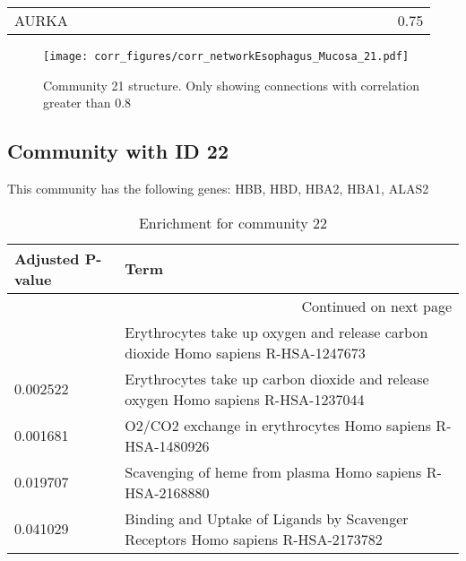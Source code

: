\begin{longtable}{lrrrrrrrrrrrrrrrrrrrrrrr}
AURKA  &              &            &             &             &            &             &             &              &             &             &              &              &             &             &            &            &             &             &             &            &             &             &        0.75 \\
\end{longtable}


\begin{figure}[h!]
\centering
\texttt{[image: corr\_figures/corr\_networkEsophagus\_Mucosa\_21.pdf]}
\caption{Community 21 structure. Only showing connections with correlation greater than 0.8}
\end{figure}




\subsection*{Community with ID 22}
This community has the following genes: HBB, HBD, HBA2, HBA1, ALAS2
\\
\begin{longtable}{p{2.4cm}p{14.5cm}}
\caption{Enrichment for community 22}\\
\toprule
Adjusted \newline P-value &                                                                               Term \\
\midrule
\endhead
\midrule
\multicolumn{2}{r}{{Continued on next page}} \\
\midrule
\endfoot

\bottomrule
\endlastfoot
                 0.002141 &  Erythrocytes take up oxygen and release carbon dioxide Homo sapiens R-HSA-1247673 \\
                 0.002522 &  Erythrocytes take up carbon dioxide and release oxygen Homo sapiens R-HSA-1237044 \\
                 0.001681 &                         O2/CO2 exchange in erythrocytes Homo sapiens R-HSA-1480926 \\
                 0.019707 &                          Scavenging of heme from plasma Homo sapiens R-HSA-2168880 \\
                 0.041029 &    Binding and Uptake of Ligands by Scavenger Receptors Homo sapiens R-HSA-2173782 \\
\end{longtable}


